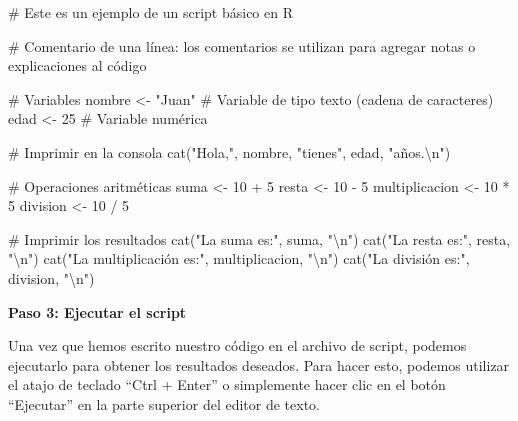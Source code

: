 \documentclass[
  letterpaper,
  DIV=11,
  numbers=noendperiod]{scrartcl}
\newenvironment{Shaded}{}{}
\newcommand{\CommentTok}[1]{\textcolor[rgb]{0.42,0.45,0.49}{#1}}
\newcommand{\DecValTok}[1]{\textcolor[rgb]{0.00,0.36,0.77}{#1}}
\newcommand{\FunctionTok}[1]{\textcolor[rgb]{0.44,0.26,0.76}{#1}}
\newcommand{\NormalTok}[1]{\textcolor[rgb]{0.14,0.16,0.18}{#1}}
\newcommand{\OtherTok}[1]{\textcolor[rgb]{0.44,0.26,0.76}{#1}}
\newcommand{\SpecialCharTok}[1]{\textcolor[rgb]{0.00,0.36,0.77}{#1}}
\newcommand{\StringTok}[1]{\textcolor[rgb]{0.01,0.18,0.38}{#1}}
\begin{document}
\begin{Shaded}
\begin{Highlighting}[]
\CommentTok{\# Este es un ejemplo de un script básico en R}

\CommentTok{\# Comentario de una línea: los comentarios se utilizan para agregar notas o explicaciones al código}

\CommentTok{\# Variables}
\NormalTok{nombre }\OtherTok{\textless{}{-}} \StringTok{"Juan"} \CommentTok{\# Variable de tipo texto (cadena de caracteres)}
\NormalTok{edad }\OtherTok{\textless{}{-}} \DecValTok{25} \CommentTok{\# Variable numérica}

\CommentTok{\# Imprimir en la consola}
\FunctionTok{cat}\NormalTok{(}\StringTok{"Hola,"}\NormalTok{, nombre, }\StringTok{"tienes"}\NormalTok{, edad, }\StringTok{"años.}\SpecialCharTok{\textbackslash{}n}\StringTok{"}\NormalTok{)}

\CommentTok{\# Operaciones aritméticas}
\NormalTok{suma }\OtherTok{\textless{}{-}} \DecValTok{10} \SpecialCharTok{+} \DecValTok{5}
\NormalTok{resta }\OtherTok{\textless{}{-}} \DecValTok{10} \SpecialCharTok{{-}} \DecValTok{5}
\NormalTok{multiplicacion }\OtherTok{\textless{}{-}} \DecValTok{10} \SpecialCharTok{*} \DecValTok{5}
\NormalTok{division }\OtherTok{\textless{}{-}} \DecValTok{10} \SpecialCharTok{/} \DecValTok{5}

\CommentTok{\# Imprimir los resultados}
\FunctionTok{cat}\NormalTok{(}\StringTok{"La suma es:"}\NormalTok{, suma, }\StringTok{"}\SpecialCharTok{\textbackslash{}n}\StringTok{"}\NormalTok{)}
\FunctionTok{cat}\NormalTok{(}\StringTok{"La resta es:"}\NormalTok{, resta, }\StringTok{"}\SpecialCharTok{\textbackslash{}n}\StringTok{"}\NormalTok{)}
\FunctionTok{cat}\NormalTok{(}\StringTok{"La multiplicación es:"}\NormalTok{, multiplicacion, }\StringTok{"}\SpecialCharTok{\textbackslash{}n}\StringTok{"}\NormalTok{)}
\FunctionTok{cat}\NormalTok{(}\StringTok{"La división es:"}\NormalTok{, division, }\StringTok{"}\SpecialCharTok{\textbackslash{}n}\StringTok{"}\NormalTok{)}
\end{Highlighting}
\end{Shaded}

\textbf{Paso 3: Ejecutar el script}

Una vez que hemos escrito nuestro código en el archivo de script,
podemos ejecutarlo para obtener los resultados deseados. Para hacer
esto, podemos utilizar el atajo de teclado ``Ctrl + Enter'' o
simplemente hacer clic en el botón ``Ejecutar'' en la parte superior del
editor de texto.
\end{document}
